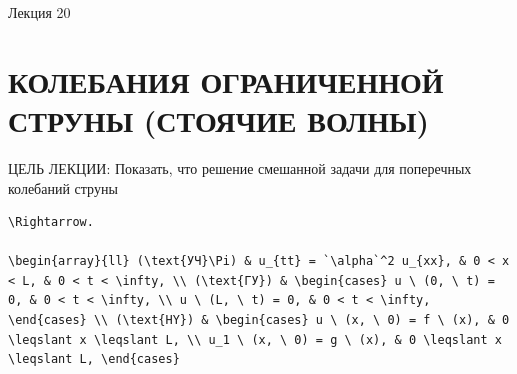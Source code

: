 \documentclass[
  ukrainian,
]{article}
\begin{document}
Лекция 20

\section{КОЛЕБАНИЯ ОГРАНИЧЕННОЙ СТРУНЫ (СТОЯЧИЕ
ВОЛНЫ)}\label{ux43aux43eux43bux435ux431ux430ux43dux438ux44f-ux43eux433ux440ux430ux43dux438ux447ux435ux43dux43dux43eux439-ux441ux442ux440ux443ux43dux44b-ux441ux442ux43eux44fux447ux438ux435-ux432ux43eux43bux43dux44b}

ЦЕЛЬ ЛЕКЦИИ: Показать, что решение смешанной задачи для поперечных
колебаний струны

\begin{verbatim}
\Rightarrow.

\begin{array}{ll} (\text{УЧ}\Pi) & u_{tt} = `\alpha`^2 u_{xx}, & 0 < x < L, & 0 < t < \infty, \\ (\text{ГУ}) & \begin{cases} u \ (0, \ t) = 0, & 0 < t < \infty, \\ u \ (L, \ t) = 0, & 0 < t < \infty, \end{cases} \\ (\text{HY}) & \begin{cases} u \ (x, \ 0) = f \ (x), & 0 \leqslant x \leqslant L, \\ u_1 \ (x, \ 0) = g \ (x), & 0 \leqslant x \leqslant L, \end{cases}


\end{verbatim}
\end{document}
